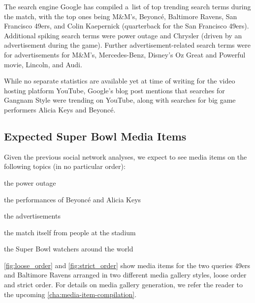 The search engine Google has compiled a~list of top trending search terms
during the match, with the top ones being M\&M's, Beyoncé, Baltimore Ravens,
San Francisco 49ers, and Colin Kaepernick (quarterback for the San Francisco 49ers).
Additional spiking search terms were power outage
and Chrysler (driven by an advertisement during the game).
Further advertisement-related search terms were for advertisements for M\&M's,
Mercedes-Benz, Disney’s Oz Great and Powerful movie, Lincoln, and Audi.

While no separate statistics are available yet at time of writing
for the video hosting platform YouTube,
Google's blog post mentions that searches for Gangnam Style were trending on YouTube,
along with searches for big game performers Alicia Keys and Beyoncé.

\subsection{Expected Super Bowl Media Items}

Given the previous social network analyses, we expect to see media items
on the following topics (in no particular order):

\begin{small_itemize}
  \item[] the power outage
  \item[] the performances of Beyoncé and Alicia Keys
  \item[] the advertisements
  \item[] the match itself from people at the stadium
  \item[] the Super Bowl watchers around the world 
\end{small_itemize}

\autoref{fig:loose_order} and \autoref{fig:strict_order} show media items
for the two queries 49ers and Baltimore Ravens arranged
in two different media gallery styles, loose order and strict order.
For details on media gallery generation, we refer the reader to the upcoming
\autoref{cha:media-item-compilation}.

